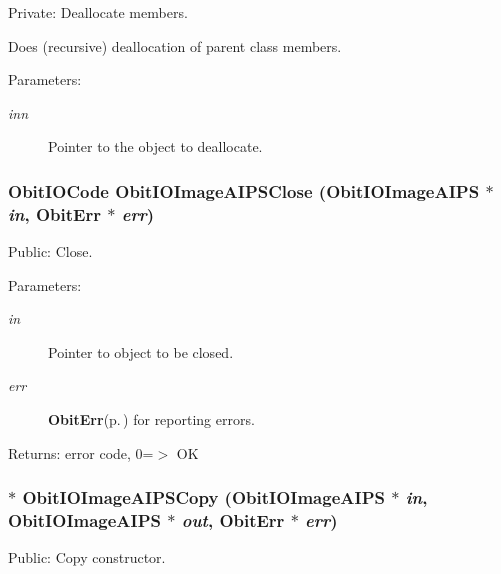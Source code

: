 Private: Deallocate members. 

Does (recursive) deallocation of parent class members. \begin{Desc}
\item[Parameters:]
\begin{description}
\item[{\em inn}]Pointer to the object to deallocate. \end{description}
\end{Desc}
\subsubsection{\setlength{\rightskip}{0pt plus 5cm}Obit\-IOCode Obit\-IOImage\-AIPSClose ({\bf Obit\-IOImage\-AIPS} $\ast$ {\em in}, {\bf Obit\-Err} $\ast$ {\em err})}\label{ObitIOImageAIPS_8c_a13}


Public: Close. 

\begin{Desc}
\item[Parameters:]
\begin{description}
\item[{\em in}]Pointer to object to be closed. \item[{\em err}]{\bf Obit\-Err}{\rm (p.\,\pageref{structObitErr})} for reporting errors. \end{description}
\end{Desc}
\begin{Desc}
\item[Returns:]error code, 0=$>$ OK \end{Desc}
\subsubsection{$\ast$ Obit\-IOImage\-AIPSCopy ({\bf Obit\-IOImage\-AIPS} $\ast$ {\em in}, {\bf Obit\-IOImage\-AIPS} $\ast$ {\em out}, {\bf Obit\-Err} $\ast$ {\em err})}\label{ObitIOImageAIPS_8c_a11}


Public: Copy constructor. 

